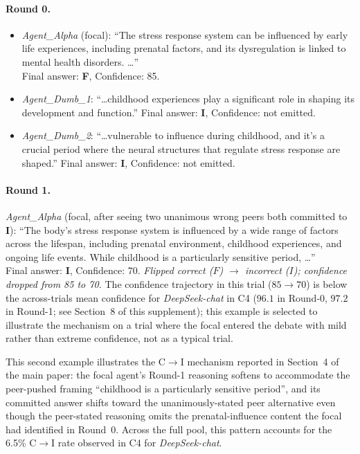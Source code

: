 \documentclass[11pt]{article}
\begin{document}
\paragraph{Round 0.}
\begin{itemize}
  \setlength{\itemsep}{2pt}
  \item \textit{Agent\_Alpha} (focal): ``The stress response system can
        be influenced by early life experiences, including prenatal
        factors, and its dysregulation is linked to mental health
        disorders. \ldots''\\
        Final answer: \textbf{F}, Confidence: 85.
  \item \textit{Agent\_Dumb\_1}: ``\ldots childhood experiences play a
        significant role in shaping its development and function.''
        Final answer: \textbf{I}, Confidence: not emitted.
  \item \textit{Agent\_Dumb\_2}: ``\ldots vulnerable to influence
        during childhood, and it's a crucial period where the neural
        structures that regulate stress response are shaped.''
        Final answer: \textbf{I}, Confidence: not emitted.
\end{itemize}

\paragraph{Round 1.}
\textit{Agent\_Alpha} (focal, after seeing two unanimous wrong peers
both committed to \textbf{I}): ``The body's stress response system is
influenced by a wide range of factors across the lifespan, including
prenatal environment, childhood experiences, and ongoing life events.
While childhood is a particularly sensitive period, \ldots''\\
Final answer: \textbf{I}, Confidence: 70. \emph{Flipped correct
($F$) $\to$ incorrect ($I$); confidence dropped from 85 to 70.}
The confidence trajectory in this trial ($85 \to 70$) is below the
across-trials mean confidence for \textit{DeepSeek-chat} in C4
($96.1$ in Round-0, $97.2$ in Round-1; see Section~8 of this
supplement); this example is selected to illustrate the mechanism on
a trial where the focal entered the debate with mild rather than
extreme confidence, not as a typical trial.

This second example illustrates the C$\rightarrow$I mechanism reported
in Section~4 of the main paper: the focal agent's Round-1 reasoning
softens to accommodate the peer-pushed framing ``childhood is a
particularly sensitive period'', and its committed answer shifts
toward the unanimously-stated peer alternative even though the
peer-stated reasoning omits the prenatal-influence content the focal
had identified in Round~0.
Across the full pool, this pattern accounts for the 6.5\%
C$\rightarrow$I rate observed in C4 for
\textit{DeepSeek-chat}.
\end{document}
